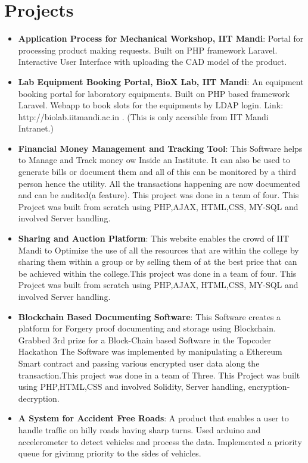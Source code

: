 \documentclass[letterpaper,11pt]{article}
\newcommand{\resumeItem}[2]{
  \item\small{
    \textbf{#1}{: #2 \vspace{-2pt}}
  }
}
\newcommand{\resumeSubItem}[2]{\resumeItem{#1}{#2}\vspace{-4pt}}
\newcommand{\resumeSubHeadingListStart}{\begin{itemize}[leftmargin=*]}
\newcommand{\resumeSubHeadingListEnd}{\end{itemize}}
\begin{document}
\section{Projects}
  \resumeSubHeadingListStart
    \resumeSubItem{Application Process for Mechanical Workshop, IIT Mandi}
      {Portal for processing product making requests. Built on PHP framework Laravel. Interactive User Interface with uploading the CAD model of the product.}
    \resumeSubItem{Lab Equipment Booking Portal, BioX Lab, IIT Mandi}
      {An equipment booking portal for laboratory equipments. Built on PHP based framework Laravel. Webapp to book slots for the equipments by LDAP login. Link: http://biolab.iitmandi.ac.in . (This is only accesible from IIT Mandi Intranet.)}
    \resumeSubItem{Financial Money Management and Tracking Tool}
      {This Software helps to Manage and Track money ow Inside an Institute. It can also be used to generate bills
or document them and all of this can be monitored by a third person hence the utility. All the transactions
happening are now documented and can be audited(a feature). This project was done in a team of four.
This Project was built from scratch using PHP,AJAX, HTML,CSS, MY-SQL and involved Server handling.}
    \resumeSubItem{Sharing and Auction Platform}
      {This website enables the crowd of IIT Mandi to Optimize the use of all the resources that are within the
college by sharing them within a group or by selling them of at the best price that can be achieved within the
college.This project was done in a team of four.
This Project was built from scratch using PHP,AJAX, HTML,CSS, MY-SQL and involved Server handling.}
      \resumeSubItem{Blockchain Based Documenting Software}
      {This Software creates a platform for Forgery proof documenting and storage using Blockchain.
Grabbed 3rd prize for a Block-Chain based Software in the Topcoder Hackathon
The Software was implemented by manipulating a Ethereum Smart contract and passing various encrypted
user data along the transaction.This project was done in a team of Three.
This Project was built using PHP,HTML,CSS and involved Solidity, Server handling, encryption-decryption.}
      \resumeSubItem{A System for Accident Free Roads}
      {A product that enables a user to handle traffic on hilly roads having sharp turns. Used arduino and accelerometer to detect vehicles and process the data. Implemented a priority queue for givimng priority to the sides of vehicles. }
  \resumeSubHeadingListEnd



  
\end{document}
